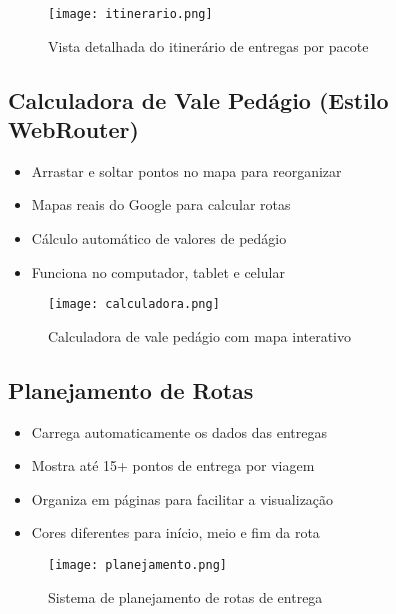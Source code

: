 \documentclass[12pt,a4paper]{article}
\begin{document}
\begin{figure}[H]
    \centering
    \vspace{1cm} %
    \texttt{[image: itinerario.png]}
    \vspace{1cm} %
    \caption{Vista detalhada do itinerário de entregas por pacote}
\end{figure}

\subsection{Calculadora de Vale Pedágio (Estilo WebRouter)}
\begin{itemize}
    \item Arrastar e soltar pontos no mapa para reorganizar
    \item Mapas reais do Google para calcular rotas
    \item Cálculo automático de valores de pedágio
    \item Funciona no computador, tablet e celular
\end{itemize}

\begin{figure}[H]
    \centering
    \vspace{1cm} %
    \texttt{[image: calculadora.png]}
    \vspace{1cm} %
    \caption{Calculadora de vale pedágio com mapa interativo}
\end{figure}

\subsection{Planejamento de Rotas}
\begin{itemize}
    \item Carrega automaticamente os dados das entregas
    \item Mostra até 15+ pontos de entrega por viagem
    \item Organiza em páginas para facilitar a visualização
    \item Cores diferentes para início, meio e fim da rota
\end{itemize}

\begin{figure}[H]
    \centering
    \vspace{1cm} %
    \texttt{[image: planejamento.png]}
    \vspace{1cm} %
    \caption{Sistema de planejamento de rotas de entrega}
\end{figure}
\end{document}
